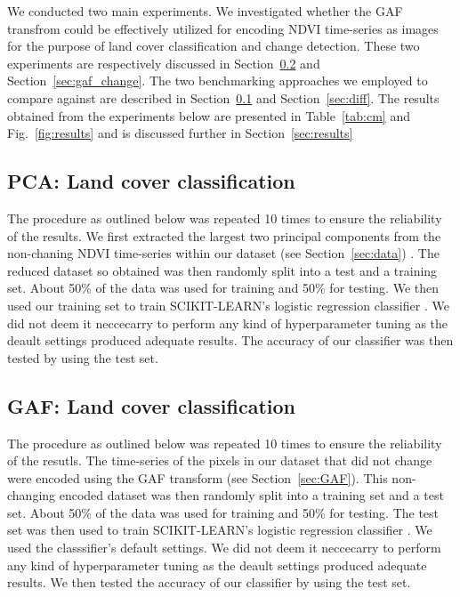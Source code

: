 \documentclass{article}
\begin{document}
We conducted two main experiments. We investigated whether the GAF transfrom could be effectively utilized for encoding NDVI time-series as images for the purpose of land cover classification and change detection. These two experiments are respectively discussed in Section~\ref{sec:gaf_class} and Section~\ref{sec:gaf_change}. The two benchmarking approaches we employed to compare against are described in Section~\ref{sec:pca} and Section~\ref{sec:diff}. The results obtained from the experiments below are presented in Table~\ref{tab:cm} and Fig.~\ref{fig:results} and is discussed further in Section~\ref{sec:results}        

\subsection{PCA: Land cover classification}
\label{sec:pca}
The procedure as outlined below was repeated 10 times to ensure the reliability of the results.  We first extracted the largest two principal components from the non-chaning NDVI time-series within our dataset (see Section~\ref{sec:data}) \cite{almeide2015,grobler2019}. The reduced dataset so obtained was then randomly split into a test and a training set. About 50\% of the data was used for training and 50\% for testing. We then used our training set to train \textsc{SCIKIT-LEARN}'s logistic regression classifier \cite{scikit2011}. We did not deem it neccecarry to perform any kind of hyperparameter tuning as the deault settings produced adequate results. The accuracy of our classifier was then tested by using the test set. 

\subsection{GAF: Land cover classification}
\label{sec:gaf_class}
The procedure as outlined below was repeated 10 times to ensure the reliability of the resutls. The time-series of the pixels in our dataset that did not change were encoded using the GAF transform (see Section~\ref{sec:GAF}). This non-changing encoded dataset was then randomly split into a training set and a test set. About 50\% of the data was used for training and 50\% for testing. The test set was then used to train \textsc{SCIKIT-LEARN}'s logistic regression classifier \cite{scikit2011}. We used the classsifier's default settings. We did not deem it neccecarry to perform any kind of hyperparameter tuning as the deault settings produced adequate results. We then tested the accuracy of our classifier by using the test set. 
\end{document}
